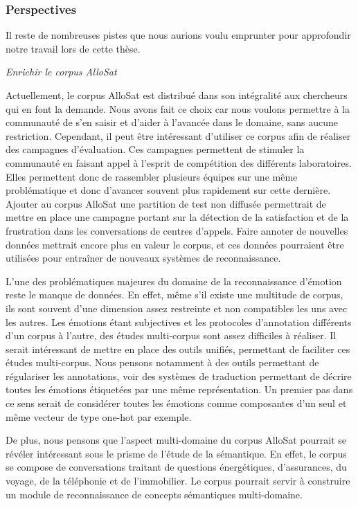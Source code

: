 \subsubsection{Perspectives}
Il reste de nombreuses pistes que nous aurions voulu emprunter pour approfondir notre travail lors de cette thèse.

\vspace{1cm}

\textit{Enrichir le corpus AlloSat}

Actuellement, le corpus AlloSat est distribué dans son intégralité aux chercheurs qui en font la demande. Nous avons fait ce choix car nous voulons permettre à la communauté de s'en saisir et d'aider à l'avancée dans le domaine, sans aucune restriction. Cependant, il peut être intéressant d'utiliser ce corpus afin de réaliser des campagnes d'évaluation. Ces campagnes permettent de stimuler la communauté en faisant appel à l'esprit de compétition des différents laboratoires. Elles permettent donc de rassembler plusieurs équipes sur une même problématique et donc d'avancer souvent plus rapidement sur cette dernière. Ajouter au corpus AlloSat une partition de test non diffusée permettrait de mettre en place une campagne portant sur la détection de la satisfaction et de la frustration dans les conversations de centres d'appels. Faire annoter de nouvelles données mettrait encore plus en valeur le corpus, et ces données pourraient être utilisées pour entraîner de nouveaux systèmes de reconnaissance.

L'une des problématiques majeures du domaine de la reconnaissance d'émotion reste le manque de données. En effet, même s'il existe une multitude de corpus, ils sont souvent d'une dimension assez restreinte et non compatibles les uns avec les autres. Les émotions étant subjectives et les protocoles d'annotation différents d'un corpus à l'autre, des études multi-corpus sont assez difficiles à réaliser. Il serait intéressant de mettre en place des outils unifiés, permettant de faciliter ces études multi-corpus. Nous pensons notamment à des outils permettant de régulariser les annotations, voir des systèmes de traduction permettant de décrire toutes les émotions étiquetées par une même représentation. Un premier pas dans ce sens serait de considérer toutes les émotions comme composantes d'un seul et même vecteur de type one-hot par exemple.

De plus, nous pensons que l'aspect multi-domaine du corpus AlloSat pourrait se révéler intéressant sous le prisme de l'étude de la sémantique. En effet, le corpus se compose de conversations traitant de questions énergétiques, d'assurances, du voyage, de la téléphonie et de l'immobilier. Le corpus pourrait servir à construire un module de reconnaissance de concepts sémantiques multi-domaine.

